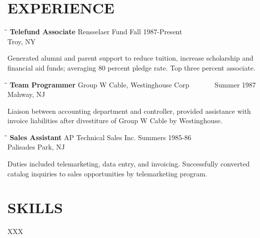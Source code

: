 \documentclass{res}
\begin{document}
\begin{resume}
\section{EXPERIENCE}
   \vspace{-0.1in}
   \begin{tabbing}
   \hspace{2.3in}\= \hspace{2.6in}\= \kill %
    {\bf Telefund Associate} \>Rensselaer Fund     \>Fall 1987-Present\\
                             \>Troy, NY
   \end{tabbing}\vspace{-20pt}      %
    Generated alumni and parent support to reduce tuition,
    increase scholarship and financial aid funds; averaging 80
    percent pledge rate. Top three percent associate.
   \begin{tabbing}
   \hspace{2.3in}\= \hspace{2.6in}\= \kill %
    {\bf Team Programmer} \>Group W Cable, Westinghouse Corp \> ~~~~~~ Summer 1987\\
                          \>Mahway, NJ
   \end{tabbing}\vspace{-20pt}
    Liaison between accounting department and controller,
    provided assistance with invoice liabilities after
    divestiture of Group W Cable by Westinghouse.
   \begin{tabbing}%
   \hspace{2.3in}\= \hspace{2.6in}\= \kill %
   {\bf Sales Assistant}  \>AP Technical Sales Inc. \> Summers  1985-86\\
                          \>Palisades Park, NJ
   \end{tabbing}\vspace{-20pt}
    Duties included telemarketing, data entry, and invoicing.
    Successfully converted catalog inquiries to sales
    opportunities by telemarketing program.


\section{SKILLS}
    XXX


\end{resume}
\end{document}
